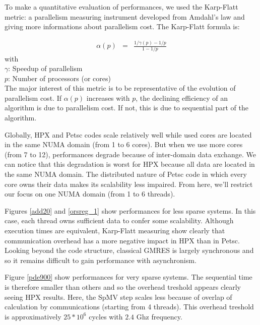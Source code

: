 \documentclass{llncs}
\begin{document}
To make a quantitative evaluation of performances, we used the Karp-Flatt metric: a parallelism measuring instrument developed from Amdahl's law and giving more informations about parallelism cost. The Karp-Flatt formula is:

\begin{eqnarray}
\alpha(p) &=&\frac{1/\gamma(p) - 1/p}{1-1/p} \label{KarpFlatt}
\end{eqnarray}
with\\
$\gamma$: Speedup of parallelism\\
$p$: Number of processors (or cores)\\

The major interest of this metric is to be representative of the evolution of parallelism cost. If $\alpha(p)$ increases with $p$, the declining efficiency of an algorithm is due to parallelism cost. If not, this is due to sequential part of the algorithm.\smallskip

Globally, HPX and Petsc codes scale relatively well while used cores are located in the same NUMA domain (from 1 to 6 cores). But when we use more cores (from 7 to 12), performances degrade because of inter-domain data exchange. We can notice that this degradation is worst for HPX because all data are located in the same NUMA domain. The distributed nature of Petsc code in which every core owns their data makes its scalability less impaired. From here, we'll restrict our focus on one NUMA domain (from 1 to 6 threads).\smallskip   

Figures \ref{add20} and \ref{orsreg_1} show performances for less sparse systems. In this case, each thread owns sufficient data to confer some scalability. Although execution times are equivalent, Karp-Flatt measuring show clearly that communication overhead has a more negative impact in HPX than in Petsc. Looking beyond the code structure, classical GMRES is largely synchronous and so it remains difficult to gain performance with asynchronism.\smallskip

Figure  \ref{pde900} show performances for very sparse systems. The sequential time is therefore smaller than others and so the overhead treshold appears clearly seeing HPX results. Here, the SpMV step scales less because of overlap of calculation by communications (starting from 4 threads). This overhead treshold is approximatively $25*10^{6}$ cycles with $2.4$ Ghz frequency.
\end{document}
